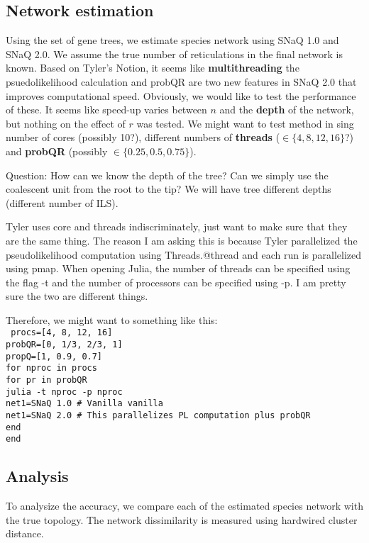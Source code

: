 \documentclass{article}
\newcommand{\kevin}{\color{blue}}
\begin{document}
\subsection{Network estimation}
Using the set of gene trees, we estimate species network using SNaQ 1.0 and SNaQ 2.0. We assume the true number of reticulations in the final network is known. Based on Tyler's Notion, it seems like \textbf{multithreading} the psuedolikelihood calculation and probQR are two new features in SNaQ 2.0 that improves computational speed. Obviously, we would like to test the performance of these. It seems like speed-up varies between $n$ and the \textbf{depth} of the network, but nothing on the effect of $r$ was tested. We might want to test method in sing number of cores (possibly 10?), different numbers of \textbf{threads} ($\in \{4, 8, 12, 16\}$?) and \textbf{probQR} (possibly $\in \{0.25, 0.5, 0.75\}$). 

{\kevin Question: How can we know the depth of the tree? Can we simply use the coalescent unit from the root to the tip? We will have tree different depths (different number of ILS).}

{\kevin Tyler uses core and threads indiscriminately, just want to make sure that they are the same thing. The reason I am asking this is because Tyler parallelized the pseudolikelihood computation using Threads.@thread and each run is parallelized using pmap. When opening Julia, the number of threads can be specified using the flag -t and the number of processors can be specified using -p. I am pretty sure the two are different things.

Therefore, we might want to something like this:\\
\texttt{
procs=[4, 8, 12, 16]\\
probQR=[0, 1/3, 2/3, 1]\\
propQ=[1, 0.9, 0.7]\\
for nproc in procs\\
	for pr in probQR\\
		julia -t nproc -p nproc \\
		net1=SNaQ 1.0 \# Vanilla vanilla \\ 
		net1=SNaQ 2.0 \# This parallelizes PL computation plus probQR\\
		end\\
		end	\\	
}
}





\subsection{Analysis}
To analysize the accuracy, we compare each of the estimated species network with the true topology. The network dissimilarity is measured using hardwired cluster distance. 
\end{document}
